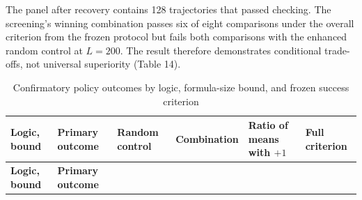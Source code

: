 \documentclass[pdflatex,sn-basic,Numbered]{sn-jnl}
\begin{document}
The panel after recovery contains 128 trajectories that passed checking. The screening's winning combination passes six of eight comparisons under the overall criterion from the frozen protocol but fails both comparisons with the enhanced random control at \(L = 200\). The result therefore demonstrates conditional trade-offs, not universal superiority (Table 14).

\begingroup
\small
\setlength{\tabcolsep}{3pt}
\renewcommand{\arraystretch}{1.13}

\begin{longtable}[]{@{}
  >{\raggedright\arraybackslash}p{}
  >{\raggedright\arraybackslash}p{}
  >{\raggedleft\arraybackslash}p{}
  >{\raggedleft\arraybackslash}p{}
  >{\raggedleft\arraybackslash}p{}
  >{\raggedright\arraybackslash}p{}@{}}
\caption{Confirmatory policy outcomes by logic, formula-size bound, and frozen success criterion}\label{tab:14}\tabularnewline
\toprule\noalign{}
\begin{minipage}[b]{\linewidth}\raggedright
\textbf{Logic, bound}
\end{minipage} & \begin{minipage}[b]{\linewidth}\raggedright
\textbf{Primary outcome}
\end{minipage} & \begin{minipage}[b]{\linewidth}\raggedleft
\textbf{Random control}
\end{minipage} & \begin{minipage}[b]{\linewidth}\raggedleft
\textbf{Combi\-nation}
\end{minipage} & \begin{minipage}[b]{\linewidth}\raggedleft
\textbf{Ratio of means with} \(+ 1\)
\end{minipage} & \begin{minipage}[b]{\linewidth}\raggedright
\textbf{Full criterion}
\end{minipage} \\
\midrule\noalign{}
\endfirsthead
\toprule\noalign{}
\begin{minipage}[b]{\linewidth}\raggedright
\textbf{Logic, bound}
\end{minipage} & \begin{minipage}[b]{\linewidth}\raggedright
\textbf{Primary outcome}
\end{minipage} & \begin{minipage}[b]{\linewidth}\raggedleft

\end{minipage}
\end{longtable}
\end{document}
